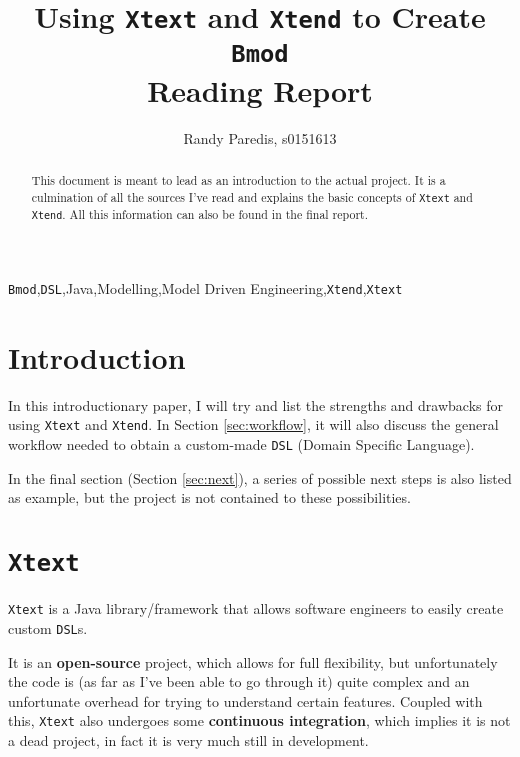 \documentclass[review]{elsarticle}
\begin{document}
\begin{frontmatter}

\title{Using \texttt{Xtext} and \texttt{Xtend} to Create \texttt{Bmod}\\\normalsize{Reading Report}}

\author{Randy Paredis, s0151613}
\address{Master in Computer Science, University of Antwerp}

\begin{abstract}
This document is meant to lead as an introduction to the actual project. It is a culmination of all the sources I've read and explains the basic concepts of \texttt{Xtext} and \texttt{Xtend}. All this information can also be found in the final report.
\end{abstract}

\begin{keyword}
\texttt{Bmod}\sep\texttt{DSL}\sep\textsf{Java}\sep Modelling\sep Model Driven Engineering\sep\texttt{Xtend}\sep\texttt{Xtext}
\end{keyword}

\end{frontmatter}

\linenumbers

\section{Introduction}
In this introductionary paper, I will try and list the strengths and drawbacks for using \texttt{Xtext} and \texttt{Xtend}. In \textsf{Section \ref{sec:workflow}}, it will also discuss the general workflow needed to obtain a custom-made \texttt{DSL} (Domain Specific Language).

In the final section (\textsf{Section \ref{sec:next}}), a series of possible next steps is also listed as example, but the project is not contained to these possibilities.

\section{\texttt{Xtext}}
\texttt{Xtext} \cite{xtext} is a \textsf{Java} library/framework that allows software engineers to easily create custom \texttt{DSL}s.

It is an \textbf{open-source} project, which allows for full flexibility, but unfortunately the code is (as far as I've been able to go through it) quite complex and an unfortunate overhead for trying to understand certain features. Coupled with this, \texttt{Xtext} also undergoes some \textbf{continuous integration}, which implies it is not a dead project, in fact it is very much still in development.
\end{document}
